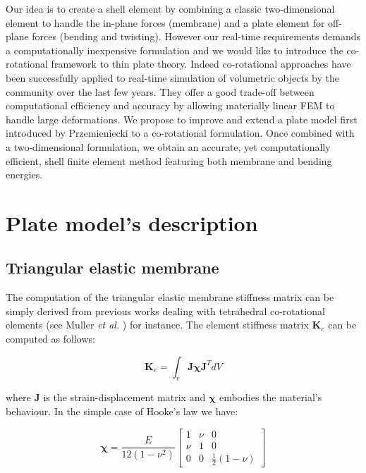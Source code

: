 \documentclass{llncs}
\begin{document}
Our idea is to create a shell element by combining a classic two-dimensional element to handle the in-plane forces (membrane) and a plate element for off-plane forces (bending and twisting). However our real-time requirements demands a computationally inexpensive formulation and we would like to introduce the co-rotational framework to thin plate theory. Indeed co-rotational approaches have been successfully applied to real-time simulation of volumetric objects by the community over the last few years. They offer a good trade-off between computational efficiency and accuracy by allowing materially linear FEM to handle large deformations. We propose to improve and extend a plate model first introduced by Przemieniecki \cite{Przemieniecki68} to a co-rotational formulation. Once combined with a two-dimensional formulation, we obtain an accurate, yet computationally efficient, shell finite element method featuring both membrane and bending energies. 


\section{Plate model's description}

\subsection{Triangular elastic membrane}
The computation of the triangular elastic membrane stiffness matrix can be simply derived from previous works dealing with tetrahedral co-rotational elements (see Muller \emph{et al.} \cite{Muller04}) for instance. The element stiffness matrix $\textbf{K}_e$ can be computed as follows:

\begin{equation}
\textbf{K}_e = \int_v \textbf{J} \boldsymbol\chi \textbf{J}^{T} dV
\end{equation} 

where $\textbf{J}$ is the strain-displacement matrix and $\boldsymbol\chi$ embodies the material's behaviour. In the simple case of Hooke's law we have:

\begin{equation}
\boldsymbol\chi = \frac{E}{12(1-\nu^2)}
	\begin{bmatrix}
	1 & \nu & 0 \\
 	\nu & 1 & 0 \\
	0 & 0 & \frac{1}{2} (1-\nu)
	\end{bmatrix}
\end{equation} 
\end{document}
